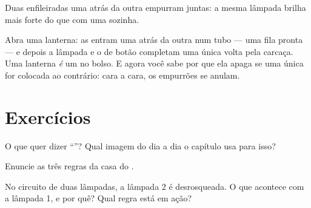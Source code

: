\begin{omfigure}

{\small Duas  enfileiradas uma atrás da outra empurram juntas:
a mesma lâmpada brilha mais forte do que com uma  sozinha.}
\end{omfigure}

\begin{example}\label{ex:g4:series-circuits:flashlight}
Abra uma lanterna: as  entram uma atrás da outra num tubo ---
uma fila pronta --- e depois a lâmpada e o  de botão
completam uma única volta pela carcaça. Uma lanterna \emph{é} um
 no bolso. E agora você sabe por que ela apaga se
uma única  for colocada ao contrário: cara a cara, os empurrões
se anulam.
\end{example}

\section{Exercícios}

\begin{exercise}[$\star$]\label{exo:g4:series-circuits:1}
O que quer dizer ``''? Qual imagem do dia a dia o capítulo
usa para isso?
\end{exercise}

\begin{exercise}[$\star$]\label{exo:g4:series-circuits:2}
Enuncie as três regras da casa do .
\end{exercise}

\begin{exercise}[$\star$]\label{exo:g4:series-circuits:3}
No circuito de duas lâmpadas, a lâmpada 2 é desrosqueada. O que
acontece com a lâmpada 1, e por quê? Qual regra está em ação?
\end{exercise}

